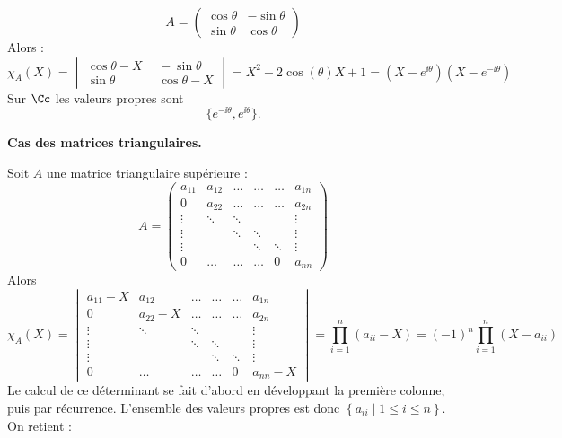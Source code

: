 \documentclass[11pt, class=report,crop=false]{standalone}
\begin{document}
\begin{exemple}
$$A = \begin{pmatrix}
\cos \theta & -\sin \theta\\
\sin \theta &\cos \theta
\end{pmatrix}$$
Alors :
\[\chi_A(X) 
= \begin{vmatrix}
\cos \theta -X \  & \ -\sin \theta\\
\sin \theta \  & \ \cos \theta-X
\end{vmatrix}
= X^2-2\cos(\theta) X +1 
= (X-e^{\ii\theta}) (X-e^{-\ii\theta})\]
Sur $\Cc$ les valeurs propres sont 
$$\big\{ e^{-\ii\theta}, e^{\ii\theta}\big\}.$$
\end{exemple}


\bigskip

\textbf{Cas des matrices triangulaires.}

\begin{exemple}
Soit $A$ une matrice triangulaire supérieure :
$$A = 
\begin{pmatrix}
a_{11} & a_{12} &\dots&\dots&\dots & a_{1n}\\
0&a_{22}&\dots&\dots&\dots&a_{2n}\\
\vdots&\ddots&\ddots&&&\vdots\\
\vdots&&\ddots&\ddots&&\vdots\\
\vdots & &&\ddots&\ddots&\vdots\\
0&\dots&\dots&\dots&0&a_{nn}
\end{pmatrix} 
$$
Alors 
$$\chi_A(X)
= \begin{vmatrix}
a_{11}-X & a_{12} &\dots&\dots&\dots & a_{1n}\\
0&a_{22}-X&\dots&\dots&\dots&a_{2n}\\
\vdots&\ddots&\ddots&&&\vdots\\
\vdots&&\ddots&\ddots&&\vdots\\
\vdots & &&\ddots&\ddots&\vdots\\
0&\dots&\dots&\dots&0&a_{nn}-X
\end{vmatrix}
= \prod_{i=1}^n(a_{ii}-X) =  (-1)^n \prod_{i=1}^n(X-a_{ii})$$
Le calcul de ce déterminant se fait d'abord en développant la première colonne, puis par récurrence.
L'ensemble des valeurs propres est donc $\left\{a_{ii} \mid 1\le i \le n\right\}$.
On retient :
\end{exemple}



\end{document}
